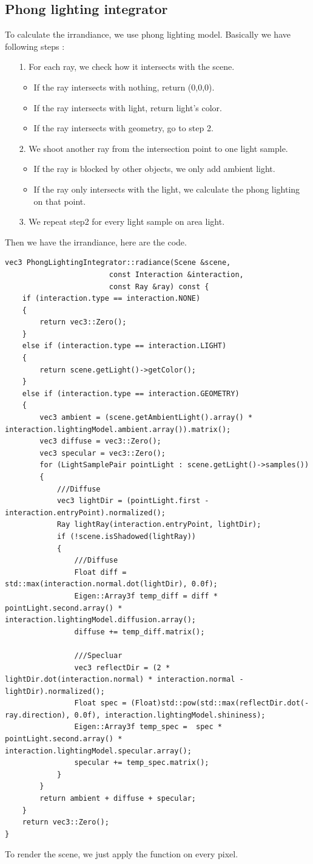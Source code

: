 \documentclass[acmtog]{acmart}
\begin{document}
\subsection{Phong lighting integrator}
To calculate the irrandiance, we use phong lighting model. Basically we have following steps :
\begin{enumerate}
	\item [1.] For each ray, we check how it intersects with the scene.
	\begin{itemize}
		\item If the ray intersects with nothing, return (0,0,0).
		\item If the ray intersects with light, return light's color.
		\item If the ray intersects with geometry, go to step 2.
	\end{itemize}
	\item [2.] We shoot another ray from the intersection point to one light sample.
	\begin{itemize}
		\item If the ray is blocked by other objects, we only add ambient light.
		\item If the ray only intersects with the light, we  calculate the phong lighting on that point.
	\end{itemize}
	\item [3.] We repeat step2 for every light sample on area light.
\end{enumerate}
Then we have the irrandiance, here are the code.
\begin{lstlisting}
vec3 PhongLightingIntegrator::radiance(Scene &scene,
						const Interaction &interaction,
						const Ray &ray) const {
	if (interaction.type == interaction.NONE)
	{
		return vec3::Zero();
	}
	else if (interaction.type == interaction.LIGHT)
	{
		return scene.getLight()->getColor();
	}
	else if (interaction.type == interaction.GEOMETRY)
	{
		vec3 ambient = (scene.getAmbientLight().array() * interaction.lightingModel.ambient.array()).matrix();
		vec3 diffuse = vec3::Zero();
		vec3 specular = vec3::Zero();
		for (LightSamplePair pointLight : scene.getLight()->samples())
		{
			///Diffuse
			vec3 lightDir = (pointLight.first - interaction.entryPoint).normalized();
			Ray lightRay(interaction.entryPoint, lightDir);
			if (!scene.isShadowed(lightRay))
			{
				///Diffuse
				Float diff = std::max(interaction.normal.dot(lightDir), 0.0f);
				Eigen::Array3f temp_diff = diff * pointLight.second.array() * interaction.lightingModel.diffusion.array();
				diffuse += temp_diff.matrix();

				///Specluar
				vec3 reflectDir = (2 * lightDir.dot(interaction.normal) * interaction.normal - lightDir).normalized();
				Float spec = (Float)std::pow(std::max(reflectDir.dot(-ray.direction), 0.0f), interaction.lightingModel.shininess);
				Eigen::Array3f temp_spec =  spec * pointLight.second.array() * interaction.lightingModel.specular.array();
				specular += temp_spec.matrix();
			}
		}
		return ambient + diffuse + specular;
	}
	return vec3::Zero();
}
\end{lstlisting}
To render the scene, we just apply the function on every pixel.
\end{document}
